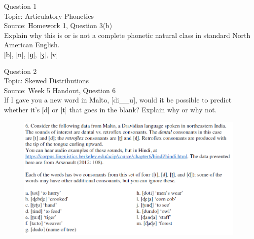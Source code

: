 \documentclass[12pt]{article}
\begin{document}
\begin{center}
\textbf{{\color{violet}{\HUGE 20201117 Tuesday\\}}}

\textbf{{\color{violet}{\HUGE ALL EXAMS\\}}}

\end{center}
\newpage

\begin{center}
\textbf{{\color{blue}{\HUGE START OF EXAM\\}}}

\textbf{{\color{blue}{\HUGE Student ID: 42792\\}}}

\textbf{{\color{blue}{\HUGE 4:00\\}}}

\end{center}
\newpage

{\large Question 1}\\

Topic: Articulatory Phonetics\\
Source: Homework 1, Question 3(b)\\

Explain why this is or is not a complete phonetic natural class in standard North American English.\\

{[b]}, {[n]}, {[ɡ]}, {[ʒ]}, {[v]}


\newpage

{\large Question 2}\\

Topic: Skewed Distributions\\
Source: Week 5 Handout, Question 6\\

If I gave you a new word in Malto, [di\_\_u], would it be possible to predict whether it's [d] or [t] that goes in the blank? Explain why or why not.\\

\begin{figure}[H]
\includegraphics{../images/malto.png}
\end{figure}
\end{document}
